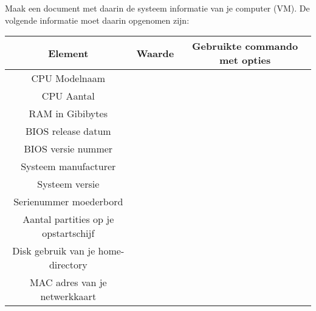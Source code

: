 Maak een document met daarin de systeem informatie van je computer (VM). De volgende informatie moet daarin opgenomen zijn:
\begin{center}
\begin{tabular}{ | c | c | c | }
\hline
Element & Waarde & Gebruikte commando met opties \\
\hline \hline
CPU Modelnaam & & \\
\hline
CPU Aantal & & \\
\hline
RAM in Gibibytes & & \\
\hline
BIOS release datum & & \\
\hline
BIOS versie nummer & & \\
\hline
Systeem manufacturer & & \\
\hline
Systeem versie & & \\
\hline
Serienummer moederbord & & \\
\hline
Aantal partities op je opstartschijf & & \\
\hline
	Disk gebruik van je home-directory & & \\
	\hline
MAC adres van je netwerkkaart & & \\
\hline
\end{tabular}
\end{center}
